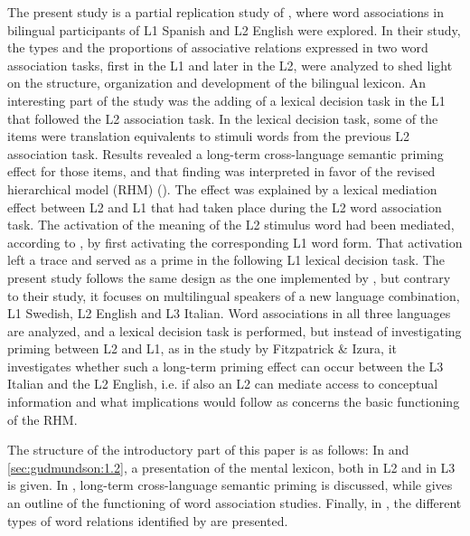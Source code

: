 \documentclass[output=paper,colorlinks,citecolor=brown,nonflat]{langsci/langscibook}
\begin{document}
The present study is a partial replication study of \citet{FitzpatrickIzura2011}, where word associations in bilingual participants of L1 Spanish and L2 English were explored. In their study, the types and the proportions of associative relations expressed in two word association tasks, first in the L1 and later in the L2, were analyzed to shed light on the structure, organization and development of the bilingual lexicon. An interesting part of the \citeauthor{FitzpatrickIzura2011} study was the adding of a lexical decision task in the L1 that followed the L2 association task. In the lexical decision task, some of the items were translation equivalents to stimuli words from the previous L2 association task. Results revealed a long-term cross-language semantic priming effect for those items, and that finding was interpreted in favor of the revised hierarchical model (RHM) (\citealt{KrollStewart1994}). The effect was explained by a lexical mediation effect between L2 and L1 that had taken place during the L2 word association task. The activation of the meaning of the L2 stimulus word had been mediated, according to \citeauthor{FitzpatrickIzura2011}, by first activating the corresponding L1 word form. That activation left a trace and served as a prime in the following L1 lexical decision task. The present study follows the same design as the one implemented by \citet{FitzpatrickIzura2011}, but contrary to their study, it focuses on multilingual speakers of a new language combination, L1 Swedish, L2 English and L3 Italian. Word associations in all three languages are analyzed, and a lexical decision task is performed, but instead of investigating priming between L2 and L1, as in the study by Fitzpatrick \& Izura, it investigates whether such a long-term priming effect can occur between the L3 Italian and the L2 English, i.e. if also an L2 can mediate access to conceptual information and what implications would follow as concerns the basic functioning of the RHM.

The structure of the introductory part of this paper is as follows: In  and \ref{sec:gudmundson:1.2}, a presentation of the mental lexicon, both in L2 and in L3 is given. In , long-term cross-language semantic priming is discussed, while  gives an outline of the functioning of word association studies. Finally, in , the different types of word relations identified by \citet{FitzpatrickIzura2011} are presented.
\end{document}
